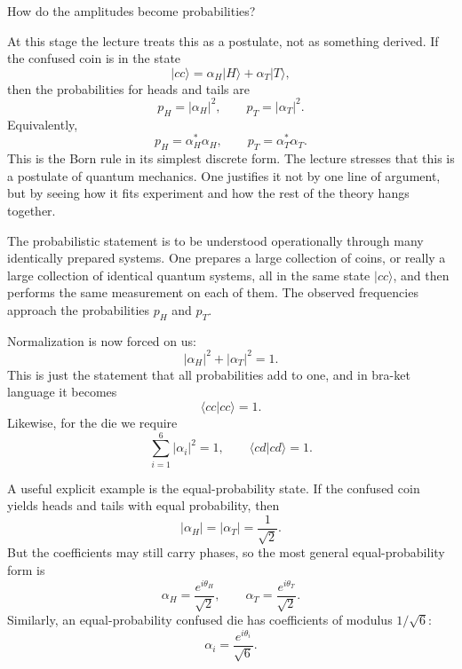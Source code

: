 How do the amplitudes become probabilities?

At this stage the lecture treats this as a postulate, not as something derived. If the confused coin is in the state
\begin{equation}
|cc\rangle = \alpha_H |H\rangle + \alpha_T |T\rangle,
\end{equation}
then the probabilities for heads and tails are
\begin{equation}
p_H = |\alpha_H|^2,
\qquad
p_T = |\alpha_T|^2.
\end{equation}
Equivalently,
\begin{equation}
p_H = \alpha_H^* \alpha_H,
\qquad
p_T = \alpha_T^* \alpha_T.
\end{equation}
This is the Born rule in its simplest discrete form. The lecture stresses that this is a postulate of quantum mechanics. One justifies it not by one line of argument, but by seeing how it fits experiment and how the rest of the theory hangs together.

The probabilistic statement is to be understood operationally through many identically prepared systems. One prepares a large collection of coins, or really a large collection of identical quantum systems, all in the same state \(|cc\rangle\), and then performs the same measurement on each of them. The observed frequencies approach the probabilities \(p_H\) and \(p_T\).

Normalization is now forced on us:
\begin{equation}
|\alpha_H|^2 + |\alpha_T|^2 = 1.
\end{equation}
This is just the statement that all probabilities add to one, and in bra-ket language it becomes
\begin{equation}
\langle cc|cc\rangle = 1.
\end{equation}
Likewise, for the die we require
\begin{equation}
\sum_{i=1}^6 |\alpha_i|^2 = 1,
\qquad
\langle cd|cd\rangle = 1.
\end{equation}

A useful explicit example is the equal-probability state. If the confused coin yields heads and tails with equal probability, then
\begin{equation}
|\alpha_H| = |\alpha_T| = \frac{1}{\sqrt{2}}.
\end{equation}
But the coefficients may still carry phases, so the most general equal-probability form is
\begin{equation}
\alpha_H = \frac{e^{i\theta_H}}{\sqrt{2}},
\qquad
\alpha_T = \frac{e^{i\theta_T}}{\sqrt{2}}.
\end{equation}
Similarly, an equal-probability confused die has coefficients of modulus \(1/\sqrt{6}\):
\begin{equation}
\alpha_i = \frac{e^{i\theta_i}}{\sqrt{6}}.
\end{equation}

